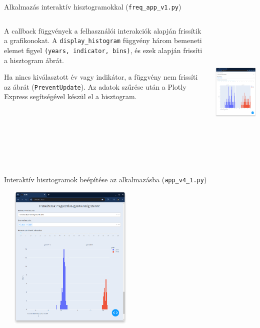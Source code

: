 \documentclass[english, aspectratio=169]{beamer}
\begin{document}
	\begin{frame}{Alkalmazás interaktív hisztogramokkal (\texttt{freq\_app\_v1.py})}
		\begin{columns}
			\begin{column}{.5\textwidth}
				A callback függvények a felhasználói interakciók alapján frissítik a grafikonokat. A \texttt{display\_histogram} függvény három bemeneti elemet figyel \texttt{(years, indicator, bins)}, és ezek alapján frissíti a hisztogram ábrát.\par\medskip
				Ha nincs kiválasztott év vagy indikátor, a függvény nem frissíti az ábrát (\texttt{PreventUpdate}). Az adatok szűrése után a Plotly Express segítségével készül el a hisztogram.
			\end{column}
			\begin{column}{.5\textwidth}
				\begin{center}
					\includegraphics[width=7cm, height=7cm, keepaspectratio]{images/freq_9.png}
				\end{center}
			\end{column}
		\end{columns}
	\end{frame}
	
	\begin{frame}{Interaktív hisztogramok beépítése az alkalmazásba (\texttt{app\_v4\_1.py})}
		\begin{center}
			\includegraphics[width=7cm, height=7cm, keepaspectratio]{images/freq_10.png}
		\end{center}
	\end{frame}
	
\end{document}
